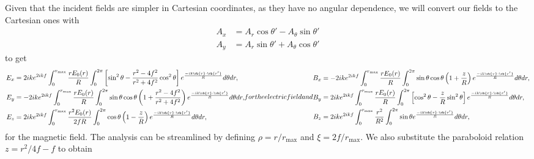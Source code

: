 \documentclass[11pt,SymmetricalJury]{inrsthesis/inrsthesis}
\begin{document}
Given that the incident fields are simpler in Cartesian coordinates, as they have
no angular dependence, we will convert our fields to the Cartesian ones with
  \begin{align*}
    A_x   &= A_r\cos\theta'-A_\theta\sin\theta' \\
    A_y   &= A_r\sin\theta'+A_\theta\cos\theta'
  \end{align*}
to get
  \begin{subequations}
  \begin{align}
    E_x      &= 2ike^{2ikf}\int_0^{r_\text{max}}\frac{rE_0(r)}{R}\int_0^{2\pi}
        \left[\sin^2\theta-\frac{r^2-4f^2}{r^2+4f^2}\cos^2\theta\right]
        e^{\frac{-ik\vb{r}\cdot\vb{r'}}{R}} d\theta dr, \\
    E_y     &= -2ike^{2ikf}\int_0^{r_\text{max}}\frac{rE_0(r)}{R}\int_0^{2\pi}
        \sin\theta\cos\theta\left(1+\frac{r^2-4f^2}{r^2+4f^2}\right)
        e^{\frac{-ik\vb{r}\cdot\vb{r'}}{R}} d\theta dr, \\
    E_z     &= 2ike^{2ikf}\int_0^{r_\text{max}}\frac{r^2E_0(r)}{2fR}\int_0^{2\pi}
        \cos\theta\left(1-\frac{z}{R}\right)
        e^{\frac{-ik\vb{r}\cdot\vb{r'}}{R}} d\theta dr,
  \end{align}
for the electric field and
  \begin{align}
    B_x       &=-2ike^{2ikf}\int_0^{r_\text{max}}\frac{rE_0(r)}{R}\int_0^{2\pi}
        \sin\theta\cos\theta\left(1+\frac{z}{R}\right)
        e^{\frac{-ik\vb{r}\cdot\vb{r'}}{R}} d\theta dr, \\
    B_y       &= 2ike^{2ikf}\int_0^{r_\text{max}}\frac{rE_0(r)}{R}\int_0^{2\pi}
        \left[\cos^2\theta-\frac{z}{R}\sin^2\theta\right]
        e^{\frac{-ik\vb{r}\cdot\vb{r'}}{R}} d\theta dr,\\
    B_z       &= 2ike^{2ikf}\int_0^{r_\text{max}}\frac{r^2}{R^2}\int_0^{2\pi}
        \sin\theta e^{\frac{-ik\vb{r}\cdot\vb{r'}}{R}} d\theta dr,
  \end{align}
  \end{subequations}
for the magnetic field. The analysis can be streamlined by defining $\rho=r/r_\text{max}$
and $\xi=2f/r_\text{max}$. We also substitute the paraboloid relation $z=r^2/4f-f$
to obtain
\end{document}
